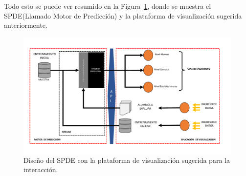 Todo esto se puede ver resumido en la Figura~\ref{fig:Sistema}, donde se muestra el SPDE(Llamado Motor de Predicción) y la plataforma de visualización sugerida anteriormente.
\begin{figure}[H]
  \centering
    \includegraphics[trim=0cm 0cm 0cm 0cm,scale=0.5]{Figuras/6SolucionPropuesta/Sistema.pdf}
      \caption{Diseño del SPDE con la plataforma de visualización sugerida para la interacción.}
    \label{fig:Sistema}
\end{figure}

